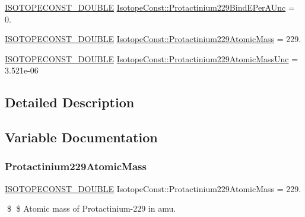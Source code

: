 \begin{DoxyCompactItemize}
\item 
\mbox{\hyperlink{group___isotope_const-_macros_ga8f45a7272ce02c0b4c65c44636ed719a}{I\+S\+O\+T\+O\+P\+E\+C\+O\+N\+S\+T\+\_\+\+D\+O\+U\+B\+LE}} \mbox{\hyperlink{group___isotope_const-_protactinium-_pa229_ga58b335a0c2779bfabfff93c8d650b944}{Isotope\+Const\+::\+Protactinium229\+Bind\+E\+Per\+A\+Unc}} = 0.
\item 
\mbox{\hyperlink{group___isotope_const-_macros_ga8f45a7272ce02c0b4c65c44636ed719a}{I\+S\+O\+T\+O\+P\+E\+C\+O\+N\+S\+T\+\_\+\+D\+O\+U\+B\+LE}} \mbox{\hyperlink{group___isotope_const-_protactinium-_pa229_ga763235793978f0d374857d61d81f5760}{Isotope\+Const\+::\+Protactinium229\+Atomic\+Mass}} = 229.
\item 
\mbox{\hyperlink{group___isotope_const-_macros_ga8f45a7272ce02c0b4c65c44636ed719a}{I\+S\+O\+T\+O\+P\+E\+C\+O\+N\+S\+T\+\_\+\+D\+O\+U\+B\+LE}} \mbox{\hyperlink{group___isotope_const-_protactinium-_pa229_ga72904ff4e35b0e5b953067ea44ec32ec}{Isotope\+Const\+::\+Protactinium229\+Atomic\+Mass\+Unc}} = 3.\+521e-\/06
\end{DoxyCompactItemize}


\subsection{Detailed Description}


\subsection{Variable Documentation}
\mbox{\label{group___isotope_const-_protactinium-_pa229_ga763235793978f0d374857d61d81f5760}} 
\subsubsection{\texorpdfstring{Protactinium229\+Atomic\+Mass}{Protactinium229AtomicMass}}
{\footnotesize\ttfamily \mbox{\hyperlink{group___isotope_const-_macros_ga8f45a7272ce02c0b4c65c44636ed719a}{I\+S\+O\+T\+O\+P\+E\+C\+O\+N\+S\+T\+\_\+\+D\+O\+U\+B\+LE}} Isotope\+Const\+::\+Protactinium229\+Atomic\+Mass = 229.}

\$ \$ Atomic mass of Protactinium-\/229 in amu. \mbox{\label{group___isotope_const-_protactinium-_pa229_ga72904ff4e35b0e5b953067ea44ec32ec}} 
